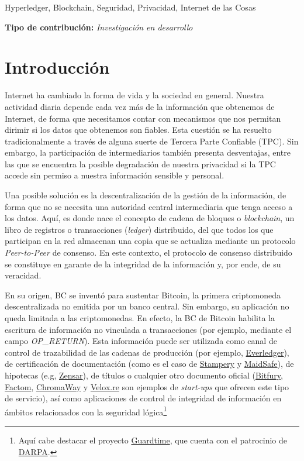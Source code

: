 \documentclass[10pt,conference,a4paper]{IEEEtran}
\begin{document}
\begin{IEEEkeywords}
Hyperledger, Blockchain, Seguridad, Privacidad, Internet de las Cosas
\end{IEEEkeywords}

{\bf Tipo de contribución:}  {\it Investigación en desarrollo}

\section{Introducción}

Internet ha cambiado la forma de vida y la sociedad en
general. Nuestra actividad diaria depende cada vez más de la
información que obtenemos de Internet, de forma que necesitamos contar
con mecanismos que nos permitan dirimir si los datos que obtenemos son
fiables. Esta cuestión se ha resuelto tradicionalmente a través de
alguna suerte de Tercera Parte Confiable (TPC). Sin embargo, la
participación de intermediarios también presenta desventajas, entre
las que se encuentra la posible degradación de nuestra privacidad si 
la TPC  accede sin permiso a nuestra información sensible y personal.

Una posible solución es la descentralización de la gestión de la
información, de
forma que no se necesita una autoridad central intermediaria que tenga
acceso a los datos. Aquí, es donde nace el
concepto de cadena de bloques o \textit{blockchain}, un libro de
registros o transacciones (\textit{ledger}) distribuido, del que todos
los que participan en la red almacenan una copia que se actualiza
mediante un protocolo \textit{Peer-to-Peer} de consenso. En este contexto, el
protocolo de consenso distribuido se constituye en garante de la
integridad de la información y, por ende, de su veracidad. 

En su origen, BC se inventó para sustentar Bitcoin, la primera
criptomoneda descentralizada no emitida por un banco central. Sin
embargo, su aplicación no queda limitada a las criptomonedas. En
efecto, la BC de Bitcoin habilita la escritura de información no
vinculada a transacciones (por ejemplo, mediante el campo
\textsc{\textit{OP\_RETURN}}). Esta información puede ser utilizada como canal
de control de trazabilidad de las cadenas de
producción (por ejemplo,
\href{https://www.everledger.io/}{Everledger}), de certificación de
documentación (como es el caso de
\href{https://stampery.com/}{Stampery} y
\href{https://maidsafe.net/}{MaidSafe}), de hipotecas (e.g,
\href{http://www.zensar.com/blogs/2017/05/reinventing-mortgage-with-blockchain/}{Zensar}),
de títulos o cualquier otro documento oficial
(\href{http://bitfury.com/}{Bitfury},
\href{https://www.factom.com/}{Factom},
\href{https://chromaway.com/}{ChromaWay} y
\href{https://www.velox.re/}{Velox.re} son ejemplos de
\emph{start-ups} que ofrecen este tipo de servicio), así como
aplicaciones de control de integridad de información en ámbitos
relacionados con la seguridad lógica\footnote{Aquí cabe destacar el
  proyecto \href{https://guardtime.com/}{Guardtime}, que cuenta con el
  patrocinio de \href{https://www.darpa.mil/}{DARPA}.}
\end{document}
